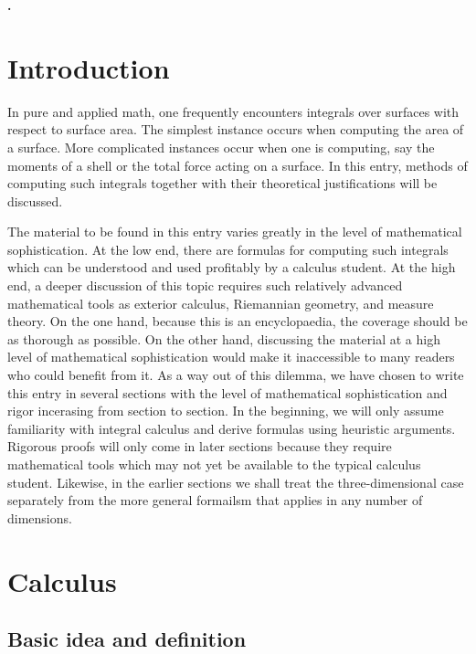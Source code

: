 \documentclass[12pt]{article}
\begin{document}
{\bf {}.}

\section{Introduction}

In pure and applied math, one frequently encounters integrals over surfaces with respect to surface area.  The simplest instance occurs when computing the area of a surface.  More complicated instances occur when one is computing, say the moments of a shell or the total force acting on a surface.  In this entry, methods of computing such integrals together with their theoretical justifications will be discussed.

The material to be found in this entry varies greatly in the level of mathematical sophistication.  At the low end, there are formulas for computing such integrals which can be understood and used profitably by a calculus student.  At the high end, a deeper discussion of this topic requires such relatively advanced mathematical tools as exterior calculus, Riemannian geometry, and measure theory.  On the one hand, because this is an encyclopaedia, the coverage should be as thorough as possible.  On the other hand, discussing the material at a high level of mathematical sophistication would make it inaccessible to many readers who could benefit from it.  As a way out of this dilemma, we have chosen to write this entry in several sections with the level of mathematical sophistication and rigor incerasing from section to section.  In the beginning, we will only assume familiarity with integral calculus and derive formulas using heuristic arguments.  Rigorous proofs will only come in later sections because they require mathematical tools which may not yet be available to the typical calculus student.  Likewise, in the earlier sections we shall treat the three-dimensional case separately from the more general formailsm that applies in any number of dimensions.

\section{Calculus}

\subsection{Basic idea and definition}
\end{document}
